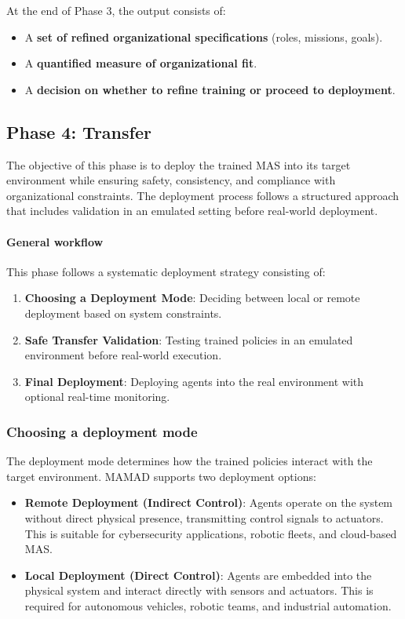 \documentclass[pdflatex,sn-mathphys-num]{sn-jnl}%
\theoremstyle{thmstyleone}%
\theoremstyle{thmstyletwo}%
\theoremstyle{thmstylethree}%
\begin{document}
At the end of Phase 3, the output consists of:
\begin{itemize}
    \item A \textbf{set of refined organizational specifications} (roles, missions, goals).
    \item A \textbf{quantified measure of organizational fit}.
    \item A \textbf{decision on whether to refine training or proceed to deployment}.
\end{itemize}



\subsection{Phase 4: Transfer}

The objective of this phase is to deploy the trained MAS into its target environment while ensuring safety, consistency, and compliance with organizational constraints. The deployment process follows a structured approach that includes validation in an emulated setting before real-world deployment.

\paragraph{\textbf{General workflow}}
This phase follows a systematic deployment strategy consisting of:
\begin{enumerate}
    \item \textbf{Choosing a Deployment Mode}: Deciding between local or remote deployment based on system constraints.
    \item \textbf{Safe Transfer Validation}: Testing trained policies in an emulated environment before real-world execution.
    \item \textbf{Final Deployment}: Deploying agents into the real environment with optional real-time monitoring.
\end{enumerate}

\subsubsection{Choosing a deployment mode}
The deployment mode determines how the trained policies interact with the target environment. MAMAD supports two deployment options:

\begin{itemize}
    \item \textbf{Remote Deployment (Indirect Control)}: Agents operate on the system without direct physical presence, transmitting control signals to actuators. This is suitable for cybersecurity applications, robotic fleets, and cloud-based MAS.
    \item \textbf{Local Deployment (Direct Control)}: Agents are embedded into the physical system and interact directly with sensors and actuators. This is required for autonomous vehicles, robotic teams, and industrial automation.
\end{itemize}
\end{document}
